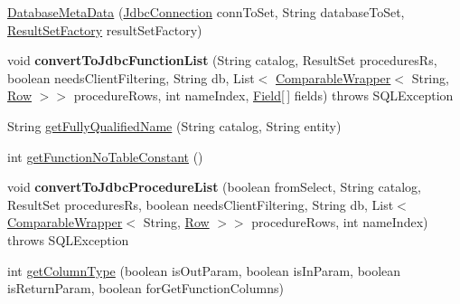 \begin{DoxyCompactItemize}
\item 
\mbox{\hyperlink{classcom_1_1mysql_1_1cj_1_1jdbc_1_1_database_meta_data_a42c3cdfdc4a332f7c7bd740e2c069071}{Database\+Meta\+Data}} (\mbox{\hyperlink{interfacecom_1_1mysql_1_1cj_1_1jdbc_1_1_jdbc_connection}{Jdbc\+Connection}} conn\+To\+Set, String database\+To\+Set, \mbox{\hyperlink{classcom_1_1mysql_1_1cj_1_1jdbc_1_1result_1_1_result_set_factory}{Result\+Set\+Factory}} result\+Set\+Factory)
\item 
\mbox{\label{classcom_1_1mysql_1_1cj_1_1jdbc_1_1_database_meta_data_a23ca9ddec13a2fa4cc61de50318d425a}} 
void {\bfseries convert\+To\+Jdbc\+Function\+List} (String catalog, Result\+Set procedures\+Rs, boolean needs\+Client\+Filtering, String db, List$<$ \mbox{\hyperlink{classcom_1_1mysql_1_1cj_1_1jdbc_1_1_database_meta_data_1_1_comparable_wrapper}{Comparable\+Wrapper}}$<$ String, \mbox{\hyperlink{interfacecom_1_1mysql_1_1cj_1_1result_1_1_row}{Row}} $>$$>$ procedure\+Rows, int name\+Index, \mbox{\hyperlink{classcom_1_1mysql_1_1cj_1_1result_1_1_field}{Field}}\mbox{[}$\,$\mbox{]} fields)  throws S\+Q\+L\+Exception 
\item 
String \mbox{\hyperlink{classcom_1_1mysql_1_1cj_1_1jdbc_1_1_database_meta_data_a88f763d1ddaabe666f7078dd8cd0d853}{get\+Fully\+Qualified\+Name}} (String catalog, String entity)
\item 
int \mbox{\hyperlink{classcom_1_1mysql_1_1cj_1_1jdbc_1_1_database_meta_data_a2f68f4cef1f669ef4e6b85ae8fc98ede}{get\+Function\+No\+Table\+Constant}} ()
\item 
\mbox{\label{classcom_1_1mysql_1_1cj_1_1jdbc_1_1_database_meta_data_abe0f1cab8659812bac94f67040bddc4b}} 
void {\bfseries convert\+To\+Jdbc\+Procedure\+List} (boolean from\+Select, String catalog, Result\+Set procedures\+Rs, boolean needs\+Client\+Filtering, String db, List$<$ \mbox{\hyperlink{classcom_1_1mysql_1_1cj_1_1jdbc_1_1_database_meta_data_1_1_comparable_wrapper}{Comparable\+Wrapper}}$<$ String, \mbox{\hyperlink{interfacecom_1_1mysql_1_1cj_1_1result_1_1_row}{Row}} $>$$>$ procedure\+Rows, int name\+Index)  throws S\+Q\+L\+Exception 
\item 
int \mbox{\hyperlink{classcom_1_1mysql_1_1cj_1_1jdbc_1_1_database_meta_data_ae9c66750a6c3a4441b531d16f552a535}{get\+Column\+Type}} (boolean is\+Out\+Param, boolean is\+In\+Param, boolean is\+Return\+Param, boolean for\+Get\+Function\+Columns)

\end{DoxyCompactItemize}
